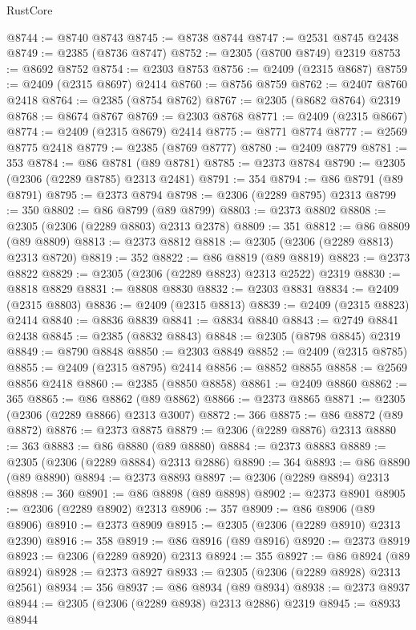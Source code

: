 \begin{lexlean}{RustCore}
\begin{coremodule}
@8744 := @8740 @8743
@8745 := @8738 @8744
@8747 := @2531 @8745 @2438
@8749 := @2385 (@8736 @8747)
@8752 := @2305 (@8700 @8749) @2319
@8753 := @8692 @8752
@8754 := @2303 @8753
@8756 := @2409 (@2315 @8687)
@8759 := @2409 (@2315 @8697) @2414
@8760 := @8756 @8759
@8762 := @2407 @8760 @2418
@8764 := @2385 (@8754 @8762)
@8767 := @2305 (@8682 @8764) @2319
@8768 := @8674 @8767
@8769 := @2303 @8768
@8771 := @2409 (@2315 @8667)
@8774 := @2409 (@2315 @8679) @2414
@8775 := @8771 @8774
@8777 := @2569 @8775 @2418
@8779 := @2385 (@8769 @8777)
@8780 := @2409 @8779
@8781 := 353
@8784 := @86 @8781 (@89 @8781)
@8785 := @2373 @8784
@8790 := @2305 (@2306 (@2289 @8785) @2313 @2481)
@8791 := 354
@8794 := @86 @8791 (@89 @8791)
@8795 := @2373 @8794
@8798 := @2306 (@2289 @8795) @2313
@8799 := 350
@8802 := @86 @8799 (@89 @8799)
@8803 := @2373 @8802
@8808 := @2305 (@2306 (@2289 @8803) @2313 @2378)
@8809 := 351
@8812 := @86 @8809 (@89 @8809)
@8813 := @2373 @8812
@8818 := @2305 (@2306 (@2289 @8813) @2313 @8720)
@8819 := 352
@8822 := @86 @8819 (@89 @8819)
@8823 := @2373 @8822
@8829 := @2305 (@2306 (@2289 @8823) @2313 @2522) @2319
@8830 := @8818 @8829
@8831 := @8808 @8830
@8832 := @2303 @8831
@8834 := @2409 (@2315 @8803)
@8836 := @2409 (@2315 @8813)
@8839 := @2409 (@2315 @8823) @2414
@8840 := @8836 @8839
@8841 := @8834 @8840
@8843 := @2749 @8841 @2438
@8845 := @2385 (@8832 @8843)
@8848 := @2305 (@8798 @8845) @2319
@8849 := @8790 @8848
@8850 := @2303 @8849
@8852 := @2409 (@2315 @8785)
@8855 := @2409 (@2315 @8795) @2414
@8856 := @8852 @8855
@8858 := @2569 @8856 @2418
@8860 := @2385 (@8850 @8858)
@8861 := @2409 @8860
@8862 := 365
@8865 := @86 @8862 (@89 @8862)
@8866 := @2373 @8865
@8871 := @2305 (@2306 (@2289 @8866) @2313 @3007)
@8872 := 366
@8875 := @86 @8872 (@89 @8872)
@8876 := @2373 @8875
@8879 := @2306 (@2289 @8876) @2313
@8880 := 363
@8883 := @86 @8880 (@89 @8880)
@8884 := @2373 @8883
@8889 := @2305 (@2306 (@2289 @8884) @2313 @2886)
@8890 := 364
@8893 := @86 @8890 (@89 @8890)
@8894 := @2373 @8893
@8897 := @2306 (@2289 @8894) @2313
@8898 := 360
@8901 := @86 @8898 (@89 @8898)
@8902 := @2373 @8901
@8905 := @2306 (@2289 @8902) @2313
@8906 := 357
@8909 := @86 @8906 (@89 @8906)
@8910 := @2373 @8909
@8915 := @2305 (@2306 (@2289 @8910) @2313 @2390)
@8916 := 358
@8919 := @86 @8916 (@89 @8916)
@8920 := @2373 @8919
@8923 := @2306 (@2289 @8920) @2313
@8924 := 355
@8927 := @86 @8924 (@89 @8924)
@8928 := @2373 @8927
@8933 := @2305 (@2306 (@2289 @8928) @2313 @2561)
@8934 := 356
@8937 := @86 @8934 (@89 @8934)
@8938 := @2373 @8937
@8944 := @2305 (@2306 (@2289 @8938) @2313 @2886) @2319
@8945 := @8933 @8944

\end{coremodule}
\end{lexlean}
